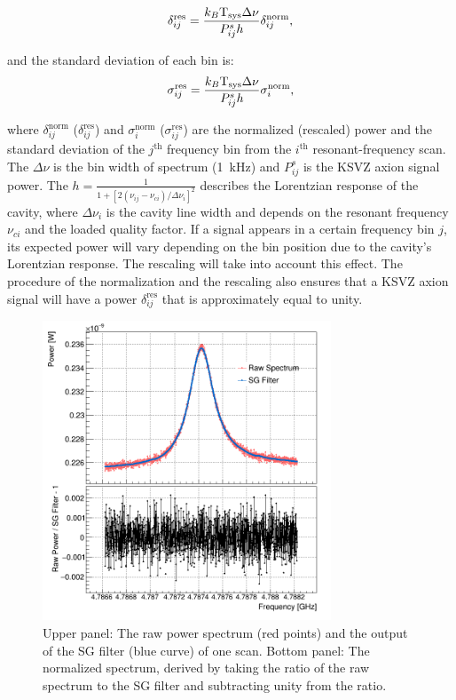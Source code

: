 \begin{equation}
  \label{eq:respower_eqn}
  \delta_{ij}^\text{res} = \frac{k_{B}\text{T}_\text{sys} \Delta\nu }{P_{ij}^{s} h}\delta_{ij}^\text{norm},
\end{equation}

and the standard deviation of each bin is:
\begin{equation}
  \label{eq:ressigma_eqn}
  \sigma_{ij}^\text{res} = \frac{k_{B}\text{T}_\text{sys}\Delta\nu }{P_{ij}^{s} h}\sigma_{i}^\text{norm},
\end{equation}

where $\delta_{ij}^\text{norm}$ ($\delta_{ij}^\text{res}$) and 
$\sigma_{i}^\text{norm}$ ($\sigma_{ij}^\text{res}$) are the 
normalized (rescaled) power and the 
standard deviation of the $j^\text{th}$ frequency bin from the 
$i^\text{th}$ resonant-frequency scan. 
The $\Delta\nu$ is the bin 
width of spectrum (1~kHz) and  $P_{ij}^{s}$ is the KSVZ axion signal power. 
The $h = \frac{1}{1 + [2(\nu_{ij} - \nu_{ci})/\Delta\nu_{i}]^2}$ 
describes the Lorentzian response of the cavity, where 
$\Delta\nu_{i}$ is the cavity line width and depends on the resonant 
frequency $\nu_{ci}$ and the loaded quality factor. 
%
If a signal appears in a certain frequency bin $j$, its expected power 
will vary depending on the bin position due to the cavity's 
Lorentzian response. The rescaling will take into account this effect. 
The procedure of the normalization and the rescaling also ensures that a 
KSVZ axion signal will have a power $\delta_{ij}^\text{res}$ 
that is approximately equal to unity. 

\begin{figure} [htbp]
  \centering
  \includegraphics[width=8.6cm]{figures/RawPower_SGPower_Ratio_vs_Freq_Step_0100.png}
  \caption{Upper panel: The raw power spectrum (red points) and the output of 
the SG filter (blue curve) of one scan. Bottom panel: The normalized 
spectrum,  derived by taking the ratio of the raw spectrum to the SG filter 
and subtracting unity from the ratio. }
  \label{fig:raw_sg_power}
\end{figure}

